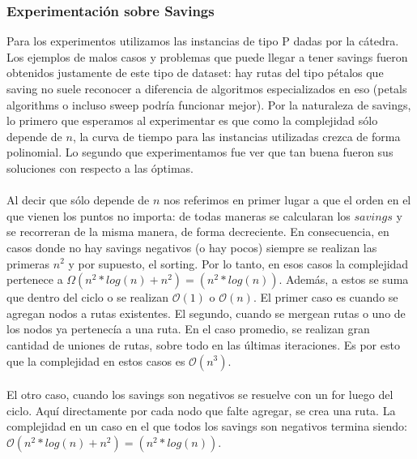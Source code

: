 \subsubsection{Experimentación sobre Savings}
Para los experimentos utilizamos las instancias de tipo P dadas por la cátedra. Los ejemplos de malos casos y problemas que puede llegar a tener savings fueron obtenidos justamente de este tipo de dataset: hay rutas del tipo pétalos que saving no suele reconocer a diferencia de algoritmos especializados en eso (petals algorithms o incluso sweep podría funcionar mejor).
Por la naturaleza de savings, lo primero que esperamos al experimentar es que como la complejidad sólo depende de $n$, la curva de tiempo para las instancias utilizadas crezca de forma polinomial. Lo segundo que experimentamos fue ver que tan buena fueron sus soluciones con respecto a las óptimas.
\paragraph{}
Al decir que sólo depende de $n$ nos referimos en primer lugar a que el orden en el que vienen los puntos no importa: de todas maneras se calcularan los $savings$ y se recorreran de la misma manera, de forma decreciente. En consecuencia, en casos donde no hay savings negativos (o hay pocos) siempre se realizan las primeras $n^{2}$ y por supuesto, el sorting. Por lo tanto, en esos casos la complejidad pertenece a $\Omega$$(n^{2}*log(n)+n^{2})=(n^{2}*log(n))$. Además, a estos se suma que dentro del ciclo o se realizan $\mathcal{O}(1)$ o $\mathcal{O}(n)$. El primer caso es cuando se agregan nodos a rutas existentes. El segundo, cuando se mergean rutas o uno de los nodos ya pertenecía a una ruta. En el caso promedio, se realizan gran cantidad de uniones de rutas, sobre todo en las últimas iteraciones. Es por esto que la complejidad en estos casos es $\mathcal{O}(n^{3})$.
\paragraph{} 
El otro caso, cuando los savings son negativos se resuelve con un for luego del ciclo. Aquí directamente por cada nodo que falte agregar, se crea una ruta. La complejidad en un caso en el que todos los savings son negativos termina siendo: $\mathcal{O}(n^{2}*log(n)+n^{2})=(n^{2}*log(n))$.

